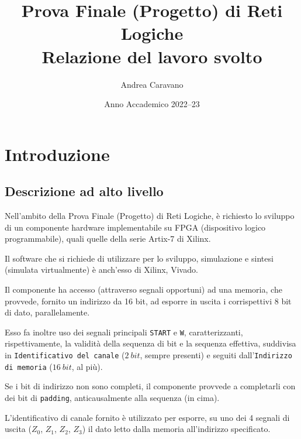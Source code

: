 \documentclass[a4paper,11pt]{article} %
\begin{document}
    \pagestyle{fancy}
    \fancyhead{}\fancyfoot{}
    \fancyfoot[C]{\thepage}

    \title{\textbf{Prova Finale (Progetto) di Reti Logiche}\\Relazione del lavoro svolto}
    \author{Andrea Caravano}
    \date{Anno Accademico 2022--23}
    \maketitle

    \tableofcontents

    \newpage


    \section{Introduzione}\label{sec:introduzione}

    \subsection{Descrizione ad alto livello}\label{subsec:descrizione-ad-alto-livello}
    Nell'ambito della Prova Finale (Progetto) di Reti Logiche, è richiesto lo sviluppo di un componente hardware implementabile su FPGA (dispositivo logico programmabile),
    quali quelle della serie Artix-7 di Xilinx.

    Il software che si richiede di utilizzare per lo sviluppo, simulazione e sintesi (simulata virtualmente) è anch'esso di Xilinx, Vivado.

    \smallskip

    Il componente ha accesso (attraverso segnali opportuni) ad una memoria, che provvede, fornito un indirizzo da 16 bit, ad esporre in uscita i corrispettivi 8 bit di dato,
    parallelamente.

    Esso fa inoltre uso dei segnali principali \texttt{START} e \texttt{W}, caratterizzanti, rispettivamente, la validità della sequenza di bit e la sequenza effettiva,
    suddivisa in \texttt{Identificativo del canale} ($2\ bit$, sempre presenti) e seguiti dall'\texttt{Indirizzo di memoria} ($16\ bit$, al più).

    Se i bit di indirizzo non sono completi, il componente provvede a completarli con dei bit di \texttt{padding}, anticausalmente alla sequenza (in cima).

    \smallskip

    L'identificativo di canale fornito è utilizzato per esporre, su uno dei 4 segnali di uscita (\texttt{$Z_0$}, \texttt{$Z_1$}, \texttt{$Z_2$}, \texttt{$Z_3$}) il dato
    letto dalla memoria all'indirizzo specificato.
\end{document}
